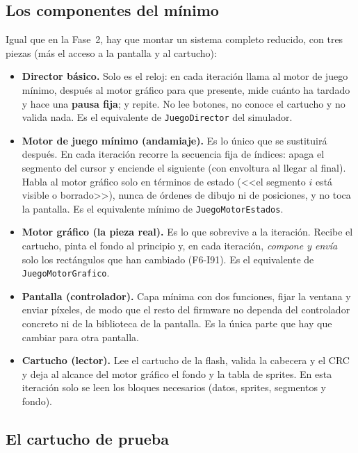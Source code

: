 \subsection{Los componentes del mínimo}
\label{sec:F6I92Componentes}

Igual que en la Fase~2, hay que montar un sistema completo reducido, con tres piezas (más el acceso a la pantalla y al cartucho):

\begin{itemize}
	\item \textbf{Director básico.} Solo es el reloj: en cada iteración llama al motor de juego mínimo, después al motor gráfico para que presente, mide cuánto ha tardado y hace una \textbf{pausa fija}; y repite. No lee botones, no conoce el cartucho y no valida nada. Es el equivalente de \texttt{JuegoDirector} del simulador.
	\item \textbf{Motor de juego mínimo (andamiaje).} Es lo único que se sustituirá después. En cada iteración recorre la secuencia fija de índices: apaga el segmento del cursor y enciende el siguiente (con envoltura al llegar al final). Habla al motor gráfico solo en términos de estado (<<el segmento $i$ está visible o borrado>>), nunca de órdenes de dibujo ni de posiciones, y no toca la pantalla. Es el equivalente mínimo de \texttt{JuegoMotorEstados}.
	\item \textbf{Motor gráfico (la pieza real).} Es lo que sobrevive a la iteración. Recibe el cartucho, pinta el fondo al principio y, en cada iteración, \emph{compone y envía} solo los rectángulos que han cambiado (F6-I91). Es el equivalente de \texttt{JuegoMotorGrafico}.
	\item \textbf{Pantalla (controlador).} Capa mínima con dos funciones, fijar la ventana y enviar píxeles, de modo que el resto del firmware no dependa del controlador concreto ni de la biblioteca de la pantalla. Es la única parte que hay que cambiar para otra pantalla.
	\item \textbf{Cartucho (lector).} Lee el cartucho de la flash, valida la cabecera y el CRC y deja al alcance del motor gráfico el fondo y la tabla de sprites. En esta iteración solo se leen los bloques necesarios (datos, sprites, segmentos y fondo).
\end{itemize}

\subsection{El cartucho de prueba}
\label{sec:F6I92Cartucho}

